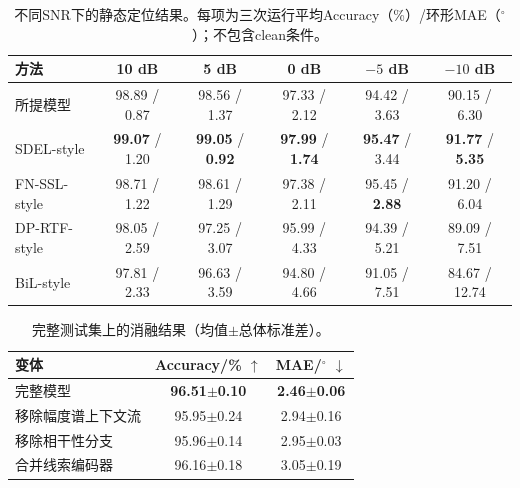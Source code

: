 \documentclass{article}
\begin{document}
\begin{table}[!t]
\centering
\caption{不同SNR下的静态定位结果。每项为三次运行平均Accuracy（\%）/环形MAE（$^\circ$）；不包含clean条件。}
\label{tab:bysnr}
\small
\begin{tabular}{lccccc}
\toprule
方法 & 10 dB & 5 dB & 0 dB & $-5$ dB & $-10$ dB \\
\midrule
所提模型 & 98.89 / 0.87 & 98.56 / 1.37 & 97.33 / 2.12 & 94.42 / 3.63 & 90.15 / 6.30 \\
SDEL-style & \textbf{99.07} / 1.20 & \textbf{99.05} / \textbf{0.92} & \textbf{97.99} / \textbf{1.74} & \textbf{95.47} / 3.44 & \textbf{91.77} / \textbf{5.35} \\
FN-SSL-style & 98.71 / 1.22 & 98.61 / 1.29 & 97.38 / 2.11 & 95.45 / \textbf{2.88} & 91.20 / 6.04 \\
DP-RTF-style & 98.05 / 2.59 & 97.25 / 3.07 & 95.99 / 4.33 & 94.39 / 5.21 & 89.09 / 7.51 \\
BiL-style & 97.81 / 2.33 & 96.63 / 3.59 & 94.80 / 4.66 & 91.05 / 7.51 & 84.67 / 12.74 \\
\bottomrule
\end{tabular}
\end{table}

\begin{table}[!t]
\centering
\caption{复杂度与完整测试集结果。定位指标为三次运行均值。}
\label{tab:complexity}
\end{table}

\begin{table}[!t]
\centering
\caption{完整测试集上的消融结果（均值$\pm$总体标准差）。}
\label{tab:ablation}
\begin{tabular}{lcc}
\toprule
变体 & Accuracy/\% $\uparrow$ & MAE/$^\circ$ $\downarrow$ \\
\midrule
完整模型 & \textbf{96.51$\pm$0.10} & \textbf{2.46$\pm$0.06} \\
移除幅度谱上下文流 & 95.95$\pm$0.24 & 2.94$\pm$0.16 \\
移除相干性分支 & 95.96$\pm$0.14 & 2.95$\pm$0.03 \\
合并线索编码器 & 96.16$\pm$0.18 & 3.05$\pm$0.19 \\
\bottomrule
\end{tabular}
\end{table}
\end{document}

